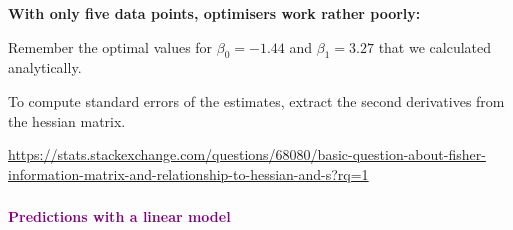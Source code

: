 \documentclass{beamer}
\begin{document}
\begin{frame}
    \frametitle{}
    \textbf{With only five data points, optimisers work rather poorly:}
    
    Remember the optimal values for $\beta_0 = -1.44$ and $\beta_1 = 3.27$ that we calculated analytically.
    \vspace{0.5cm}
    
    \scalebox{0.7}{
      
    }
    \vspace{0.5cm}
    
    To compute standard errors of the estimates, extract the second derivatives from the hessian matrix.
    \vspace{0.5cm}
    
    \scalebox{0.7}{
      
    }
    \vspace{0.5cm}
    
    \tiny{\url{https://stats.stackexchange.com/questions/68080/basic-question-about-fisher-information-matrix-and-relationship-to-hessian-and-s?rq=1}}
    
\end{frame}

\begin{frame}
    \frametitle{}
    \begin{center}
        \huge\textbf{\textcolor{purple}{Predictions with a linear model}}
    \end{center}
\end{frame}
\end{document}

